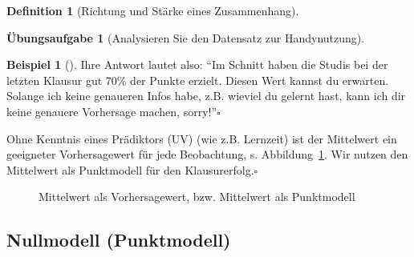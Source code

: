 \documentclass[
  a4paper,
  DIV=11]{scrreprt}
\theoremstyle{definition}
\newtheorem{exercise}{Übungsaufgabe}[chapter]
\theoremstyle{definition}
\newtheorem{example}{Beispiel}[chapter]
\theoremstyle{definition}
\newtheorem{definition}{Definition}[chapter]
\theoremstyle{remark}
\begin{document}
\begin{definition}[Richtung und Stärke eines
Zusammenhang]
\begin{exercise}[Analysieren Sie den Datensatz zur
Handynutzung]
\begin{example}[]
Ihre Antwort lautet also: ``Im Schnitt haben die Studis bei der letzten
Klausur gut 70\% der Punkte erzielt. Diesen Wert kannst du erwarten.
Solange ich keine genaueren Infos habe, z.B. wieviel du gelernt hast,
kann ich dir keine genauere Vorhersage machen, sorry!''\(\square\)

\end{example}

\begin{tcolorbox}[enhanced jigsaw, leftrule=.75mm, opacitybacktitle=0.6, colback=white, colframe=quarto-callout-note-color-frame, coltitle=black, colbacktitle=quarto-callout-note-color!10!white, opacityback=0, left=2mm, breakable, titlerule=0mm, toptitle=1mm, bottomtitle=1mm, rightrule=.15mm, title=\textcolor{quarto-callout-note-color}{\faInfo}\hspace{0.5em}{Hinweis}, arc=.35mm, bottomrule=.15mm, toprule=.15mm]

Ohne Kenntnis eines Prädiktors (UV) (wie z.B. Lernzeit) ist der
Mittelwert ein geeigneter Vorhersagewert für jede Beobachtung, s.
Abbildung~\ref{fig-noten3}. Wir nutzen den Mittelwert als Punktmodell
für den Klausurerfolg.\(\square\)

\end{tcolorbox}

\begin{figure}


\caption{\label{fig-noten3}Mittelwert als Vorhersagewert, bzw.
Mittelwert als Punktmodell}

\end{figure}%

\subsection{Nullmodell (Punktmodell)}\label{nullmodell-punktmodell}


\end{exercise}
\end{definition}
\end{document}
